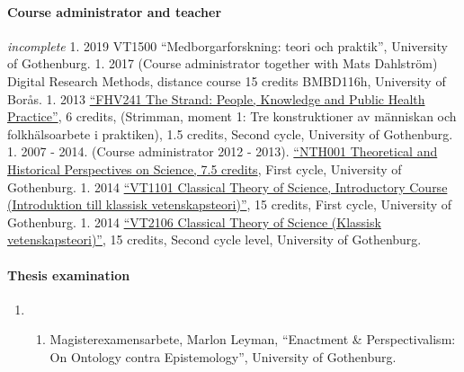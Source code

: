 \documentclass[
]{article}
\providecommand{\tightlist}{%
  \setlength{\itemsep}{0pt}\setlength{\parskip}{0pt}}
\begin{document}
\hypertarget{course-administrator-and-teacher}{%
\paragraph{Course administrator and
teacher}\label{course-administrator-and-teacher}}

\emph{incomplete} 1. 2019 VT1500 ``Medborgarforskning: teori och
praktik'', University of Gothenburg. 1. 2017 (Course administrator
together with Mats Dahlström) Digital Research Methods, distance course
15 credits BMBD116h, University of Borås. 1. 2013
\href{http://files.christopherkullenberg.se/kursplaner/FHV241Strimman.pdf}{``FHV241
The Strand: People, Knowledge and Public Health Practice''}, 6 credits,
(Strimman, moment 1: Tre konstruktioner av människan och folkhälsoarbete
i praktiken), 1.5 credits, Second cycle, University of Gothenburg. 1.
2007 - 2014. (Course administrator 2012 - 2013).
\href{http://files.christopherkullenberg.se/kursplaner/NTH001_Teoretiska_och_historiska_perspektiv_pa\%cc\%8a_naturvetenskap_10512.pdf}{``NTH001
Theoretical and Historical Perspectives on Science, 7.5 credits}, First
cycle, University of Gothenburg. 1. 2014
\href{http://files.christopherkullenberg.se/kursplaner/VT1101_Introduktion_i_klassisk_vetenskapsteori__grundkurs_13185.pdf}{``VT1101
Classical Theory of Science, Introductory Course (Introduktion till
klassisk vetenskapsteori)''}, 15 credits, First cycle, University of
Gothenburg. 1. 2014
\href{http://files.christopherkullenberg.se/kursplaner/VT2106_Klassisk_vetenskapsteori_13187.pdf}{``VT2106
Classical Theory of Science (Klassisk vetenskapsteori)''}, 15 credits,
Second cycle level, University of Gothenburg.

\hypertarget{thesis-examination}{%
\paragraph{Thesis examination}\label{thesis-examination}}

\begin{enumerate}
\def\labelenumi{\arabic{enumi}.}
\item
  \begin{enumerate}
  \def\labelenumii{\arabic{enumii}.}
  \setcounter{enumii}{2022}
  \tightlist
  \item
    Magisterexamensarbete, Marlon Leyman, ``Enactment \&
    Perspectivalism: On Ontology contra Epistemology'', University of
    Gothenburg.
  \end{enumerate}
\end{enumerate}
\end{document}
